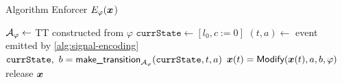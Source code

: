     \begin{algorithm}[H]
        \caption{Algorithm Enforcer $E_\varphi(\bm{x}$) }
        \label{algorithm} %
        \begin{algorithmic}[1]
            \State $\mathcal{A}_\varphi \gets $ TT constructed from $\varphi$ \label{al2line:0}
            \State $ \texttt{currState} \leftarrow  [l_0 , c:=0]$\label{al2line:1}
            \label{al2line:2}
                \State $(t, a)\gets$ event emitted by \cref{alg:signal-encoding}\label{al2line:3}
                \State $\texttt{currState}, ~b =\textsf{make\_transition}_{\mathcal{A}_{\varphi}}(\texttt{currState}, t, a)$\label{al2line:4}
                    \State $\bm{x}(t)=\textsf{Modify}(\bm{x}(t),a,b, \varphi)$\label{al2line:6}
                \EndIf
                \State release $\bm{x}$
            \EndWhile
        \end{algorithmic}
    \end{algorithm}






